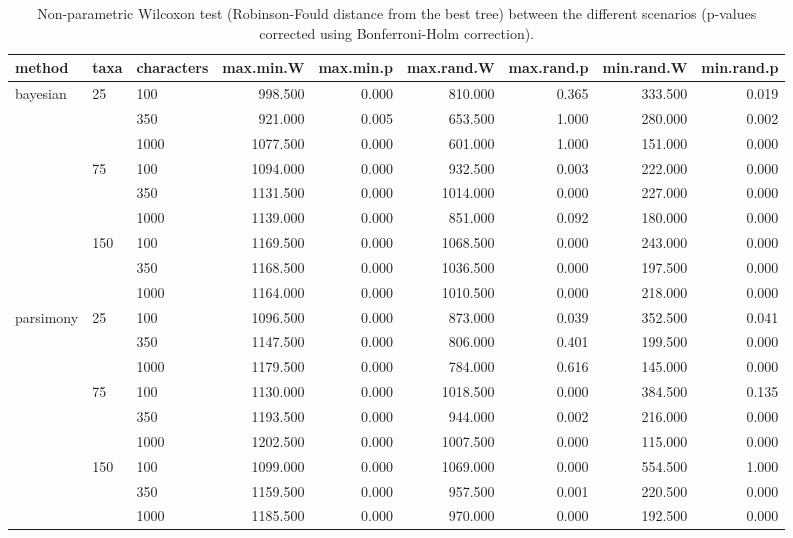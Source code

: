\begin{table}[ht]
\centering
\begin{tabular}{lllrrrrrr}
  \hline
method & taxa & characters & max.min.W & max.min.p & max.rand.W & max.rand.p & min.rand.W & min.rand.p \\ 
  \hline
bayesian & 25 & 100 & 998.500 & 0.000 & 810.000 & 0.365 & 333.500 & 0.019 \\ 
   &  & 350 & 921.000 & 0.005 & 653.500 & 1.000 & 280.000 & 0.002 \\ 
   &  & 1000 & 1077.500 & 0.000 & 601.000 & 1.000 & 151.000 & 0.000 \\ 
   & 75 & 100 & 1094.000 & 0.000 & 932.500 & 0.003 & 222.000 & 0.000 \\ 
   &  & 350 & 1131.500 & 0.000 & 1014.000 & 0.000 & 227.000 & 0.000 \\ 
   &  & 1000 & 1139.000 & 0.000 & 851.000 & 0.092 & 180.000 & 0.000 \\ 
   & 150 & 100 & 1169.500 & 0.000 & 1068.500 & 0.000 & 243.000 & 0.000 \\ 
   &  & 350 & 1168.500 & 0.000 & 1036.500 & 0.000 & 197.500 & 0.000 \\ 
   &  & 1000 & 1164.000 & 0.000 & 1010.500 & 0.000 & 218.000 & 0.000 \\ 
  parsimony & 25 & 100 & 1096.500 & 0.000 & 873.000 & 0.039 & 352.500 & 0.041 \\ 
   &  & 350 & 1147.500 & 0.000 & 806.000 & 0.401 & 199.500 & 0.000 \\ 
   &  & 1000 & 1179.500 & 0.000 & 784.000 & 0.616 & 145.000 & 0.000 \\ 
   & 75 & 100 & 1130.000 & 0.000 & 1018.500 & 0.000 & 384.500 & 0.135 \\ 
   &  & 350 & 1193.500 & 0.000 & 944.000 & 0.002 & 216.000 & 0.000 \\ 
   &  & 1000 & 1202.500 & 0.000 & 1007.500 & 0.000 & 115.000 & 0.000 \\ 
   & 150 & 100 & 1099.000 & 0.000 & 1069.000 & 0.000 & 554.500 & 1.000 \\ 
   &  & 350 & 1159.500 & 0.000 & 957.500 & 0.001 & 220.500 & 0.000 \\ 
   &  & 1000 & 1185.500 & 0.000 & 970.000 & 0.000 & 192.500 & 0.000 \\ 
   \hline
\end{tabular}
\caption{Non-parametric Wilcoxon test (Robinson-Fould distance from the best tree) between the different scenarios (p-values corrected using Bonferroni-Holm correction).} 
\label{Full_Tab_BCRFbest}
\end{table}
